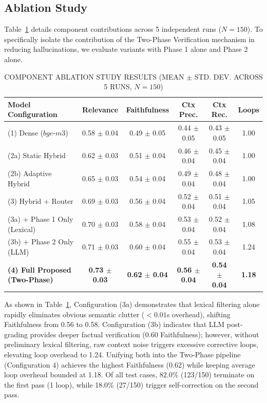\documentclass[conference]{IEEEtran}
\begin{document}
\subsection{Ablation Study}
Table~\ref{tab2} details component contributions across 5 independent runs ($N = 150$). To specifically isolate the contribution of the Two-Phase Verification mechanism in reducing hallucinations, we evaluate variants with Phase 1 alone and Phase 2 alone.

\begin{table}[!htbp]
\centering
\scriptsize
\setlength{\tabcolsep}{1.8pt}
\caption{COMPONENT ABLATION STUDY RESULTS (MEAN $\pm$ STD. DEV. ACROSS 5 RUNS, $N=150$)}
\label{tab2}
\begin{tabular}{lccccc}
\toprule
\textbf{Model Configuration} & \textbf{Relevance} & \textbf{Faithfulness} & \textbf{Ctx Prec.} & \textbf{Ctx Rec.} & \textbf{Loops} \\
\midrule
(1) Dense ($bge\text{-}m3$) & 0.58 $\pm$ 0.04 & 0.49 $\pm$ 0.05 & 0.44 $\pm$ 0.05 & 0.43 $\pm$ 0.05 & 1.00 \\
(2a) Static Hybrid & 0.62 $\pm$ 0.03 & 0.51 $\pm$ 0.04 & 0.46 $\pm$ 0.04 & 0.45 $\pm$ 0.04 & 1.00 \\
(2b) Adaptive Hybrid & 0.65 $\pm$ 0.03 & 0.54 $\pm$ 0.04 & 0.49 $\pm$ 0.04 & 0.48 $\pm$ 0.04 & 1.00 \\
(3) Hybrid + Router & 0.69 $\pm$ 0.03 & 0.56 $\pm$ 0.04 & 0.52 $\pm$ 0.04 & 0.51 $\pm$ 0.04 & 1.05 \\
(3a) + Phase 1 Only (Lexical) & 0.70 $\pm$ 0.03 & 0.58 $\pm$ 0.04 & 0.53 $\pm$ 0.04 & 0.52 $\pm$ 0.04 & 1.08 \\
(3b) + Phase 2 Only (LLM) & 0.71 $\pm$ 0.03 & 0.60 $\pm$ 0.04 & 0.55 $\pm$ 0.04 & 0.53 $\pm$ 0.04 & 1.24 \\
\textbf{(4) Full Proposed (Two-Phase)} & \textbf{0.73 $\pm$ 0.03} & \textbf{0.62 $\pm$ 0.04} & \textbf{0.56 $\pm$ 0.04} & \textbf{0.54 $\pm$ 0.04} & \textbf{1.18} \\
\bottomrule
\end{tabular}
\end{table}

As shown in Table~\ref{tab2}, Configuration (3a) demonstrates that lexical filtering alone rapidly eliminates obvious semantic clutter ($< 0.01$s overhead), shifting Faithfulness from 0.56 to 0.58. Configuration (3b) indicates that LLM post-grading provides deeper factual verification (0.60 Faithfulness); however, without preliminary lexical filtering, raw context noise triggers excessive corrective loops, elevating loop overhead to 1.24. Unifying both into the Two-Phase pipeline (Configuration 4) achieves the highest Faithfulness (0.62) while keeping average loop overhead bounded at 1.18. Of all test cases, 82.0\% (123/150) terminate on the first pass (1 loop), while 18.0\% (27/150) trigger self-correction on the second pass.
\end{document}

